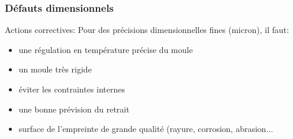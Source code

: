 \documentclass[11pt,oneside]{article}
\begin{document}
        
% 

\subsubsection{Défauts dimensionnels}
        Actions correctives: 
        Pour des précisions dimensionnelles fines (micron), il faut: 
\begin{itemize}
 \item  une régulation en température précise du moule 
 \item  un moule très rigide 
 \item  éviter les contraintes internes 
 \item  une bonne prévision du retrait 
 \item  surface de l’empreinte de grande qualité (rayure, corrosion,
abrasion...
\end{itemize}
\end{document}
